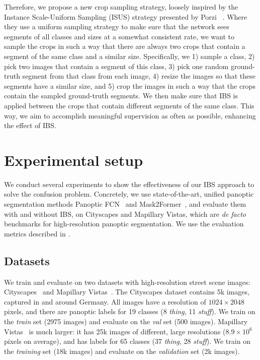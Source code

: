 \documentclass[10pt,twocolumn,letterpaper]{article}
\begin{document}
Therefore, we propose a new crop sampling strategy, loosely inspired by the Instance Scale-Uniform Sampling (ISUS) strategy presented by Porzi \etal~\cite{porzi2021allscales}. Where they use a uniform sampling strategy to make sure that the network sees segments of all classes and sizes at a somewhat consistent rate, we want to sample the crops in such a way that there are always two crops that contain a segment of the same class and a similar size. Specifically, we 1) sample a class, 2) pick two images that contain a segment of this class, 3) pick one random ground-truth segment from that class from each image, 4) resize the images so that these segments have a similar size, and 5) crop the images in such a way that the crops contain the sampled ground-truth segments. We then make sure that IBS is applied between the crops that contain different segments of the same class. This way, we aim to accomplish meaningful supervision as often as possible, enhancing the effect of IBS.
 \section{Experimental setup}
\label{sec:experiments}
We conduct several experiments to show the effectiveness of our IBS approach to solve the confusion problem. Concretely, we use state-of-the-art, unified panoptic segmentation methods Panoptic FCN~\cite{li2021panopticfcn} and Mask2Former~\cite{cheng2021mask2former}, and evaluate them with and without IBS, on Cityscapes and Mapillary Vistas, which are \textit{de facto} benchmarks for high-resolution panoptic segmentation. We use the evaluation metrics described in .


\subsection{Datasets}
\label{sec:experiments:datasets}
We train and evaluate on two datasets with high-resolution street scene images: Cityscapes~\cite{cordts2016cityscapes} and Mapillary Vistas~\cite{neuhold2017mapillary}. The Cityscapes dataset contains 5k images, captured in and around Germany. All images have a resolution of $1024\times2048$ pixels, and there are panoptic labels for 19 classes (8 \textit{thing}, 11 \textit{stuff}). We train on the \textit{train} set (2975 images) and evaluate on the \textit{val} set (500 images). Mapillary Vistas~\cite{neuhold2017mapillary} is much larger: it has 25k images of different, large resolutions ($8.9\times10^6$ pixels on average), and has labels for 65 classes (37 \textit{thing}, 28 \textit{stuff}). We train on the \textit{training} set (18k images) and evaluate on the \textit{validation} set (2k images).
\end{document}
